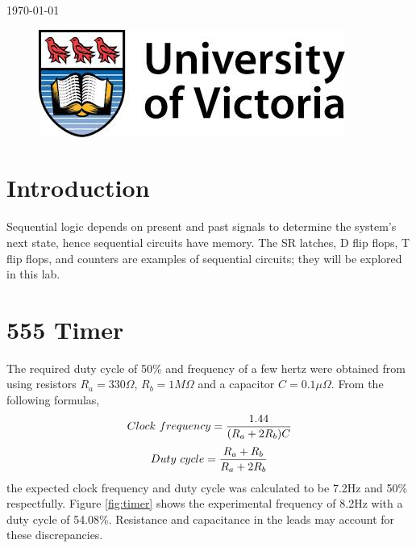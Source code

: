 \documentclass[11pt]{article}
\begin{document}
\begin{titlepage}
{\large \today}\\ %

\begin{figure}[b]	 %
	\centering
	\includegraphics[scale=0.3]{UVic_logo}
\end{figure}

\end{titlepage}


\section{Introduction}

Sequential logic depends on present and past signals to determine the system's next state, hence sequential circuits have memory. The SR latches, D flip flops, T flip flops, and counters are examples of sequential circuits; they will be explored in this lab.

\section{555 Timer}

The required duty cycle of 50\% and frequency of a few hertz were obtained from using resistors $R_a = 330\Omega$, $R_b = 1M\Omega$  and a capacitor $C = 0.1\mu\Omega$. From the following formulas,
\[
       Clock\\\ frequency=\frac { 1.44 }{ ({ R }_{ a }+2{ R }_{ b })C } 
\]
\[
       Duty\\\ cycle=\frac { { R }_{ a }+{ R }_{ b } }{ { R }_{ a }+2{ R }_{ b } } 
\]
the expected clock frequency and duty cycle was calculated to be 7.2Hz and 50\% respectfully. Figure \ref{fig:timer} shows the experimental frequency of 8.2Hz with a duty cycle of 54.08\%. Resistance and capacitance in the leads may account for these discrepancies. 
\end{document}
